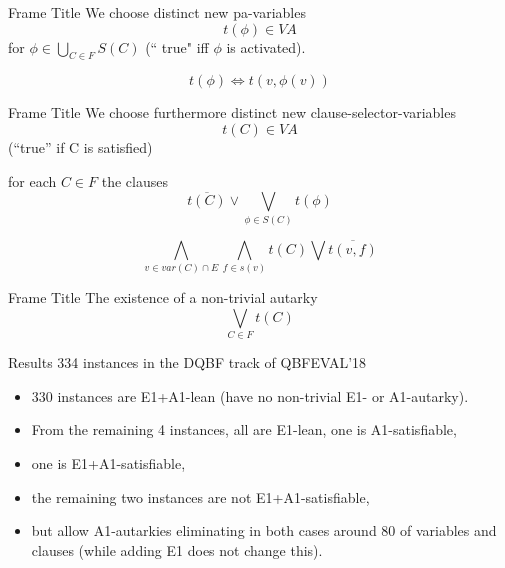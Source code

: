 \documentclass[xcolor=table	]{beamer}
\begin{document}
\begin{frame}{Frame Title}
We choose distinct new pa-variables
\[ t(\phi) \in VA 
\]
for $\phi \in \bigcup\limits_{C \in F} S(C)$ (`` true" iff $\phi$ is activated).

\begin{equation}
t(\phi) \iff t(v, \phi(v))
\end{equation}
\end{frame}


\begin{frame}{Frame Title}
We choose furthermore distinct new clause-selector-variables
\[ t(C) \in VA \]
(``true” if C is satisfied)

for each $C \in F$ the clauses
\begin{equation}
    \overline{t(C)} \vee \bigvee_{\phi \in S(C)} t(\phi)
\end{equation}

\begin{equation}
    \bigwedge_{v \in var(C) \cap E} \bigwedge_{f \in s(v)} t(C) \bigvee \overline{t(v,f)}
\end{equation}
\end{frame}

\begin{frame}{Frame Title}
    The existence of a non-trivial autarky 
  \begin{equation}
    \bigvee_{C \in F} t(C)
  \end{equation}
\end{frame}

\begin{frame}{Results}
334 instances in the DQBF track of QBFEVAL'18 

\begin{itemize}
    \item 330 instances are E1+A1-lean (have no non-trivial E1- or A1-autarky). 
    \item From the remaining 4 instances, all are E1-lean, one is A1-satisfiable, 
    \item one is E1+A1-satisfiable, 
    \item the remaining two instances are not E1+A1-satisfiable,
    \item but allow A1-autarkies eliminating in both cases around 80 of variables
and clauses (while adding E1 does not change this).
\end{itemize}

\end{frame}
\end{document}
